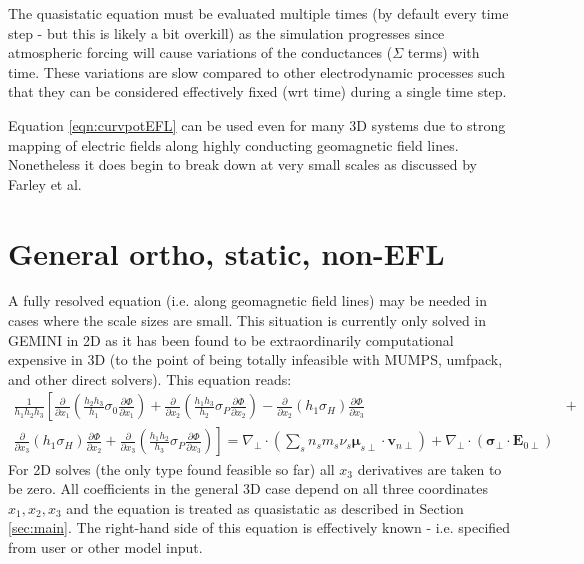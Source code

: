 \documentclass[11pt,letterpaper]{article}
\begin{document}
The quasistatic equation must be evaluated multiple times (by default every time step - but this is likely a bit overkill) as the simulation progresses since atmospheric forcing will cause variations of the conductances ($\Sigma$ terms) with time.  These variations are slow compared to other electrodynamic processes such that they can be considered effectively fixed (wrt time) during a single time step.

Equation \ref{eqn:curvpotEFL} can be used even for many 3D systems due to strong mapping of electric fields along highly conducting geomagnetic field lines.  Nonetheless it does begin to break down at very small scales as discussed by Farley et al.  


\section{General ortho, static, non-EFL}

A fully resolved equation (i.e. along geomagnetic field lines) may be needed in cases where the scale sizes are small.  This situation is currently only solved in GEMINI in 2D as it has been found to be extraordinarily computational expensive in 3D (to the point of being totally infeasible with MUMPS, umfpack, and other direct solvers).  This equation reads:  
\begin{eqnarray}
\frac{1}{h_1 h_2 h_3} \left[ \frac{\partial}{\partial x_1} \left( \frac{h_2 h_3}{h_1} \sigma_0 \frac{\partial \Phi}{\partial x_1} \right) + \frac{\partial}{\partial x_2} \left( \frac{h_1 h_3}{h_2} \sigma_P \frac{\partial \Phi}{\partial x_2} \right) -  \right. \frac{\partial}{\partial x_2} \left( h_1 \sigma_H \right) \frac{\partial \Phi}{\partial x_3} &+& \nonumber \\ \left. \frac{\partial}{\partial x_3} \left( h_1 \sigma_H \right) \frac{\partial \Phi}{\partial x_2} + \frac{\partial}{\partial x_3} \left( \frac{h_1 h_2}{h_3} \sigma_P \frac{\partial \Phi}{\partial x_3} \right)
\right]  = \nabla_\perp \cdot \left( \sum_s n_s m_s \nu_s \boldsymbol{\mu}_{s\perp} \cdot \mathbf{v}_{n\perp} \right) + \nabla_\perp \cdot \left( \boldsymbol{\sigma}_\perp \cdot \mathbf{E}_{0\perp} \right) \label{eqn:curvpot}
\end{eqnarray}
For 2D solves (the only type found feasible so far) all $x_3$ derivatives are taken to be zero.  All coefficients in the general 3D case depend on all three coordinates $x_1,x_2,x_3$ and the equation is treated as quasistatic as described in Section \ref{sec:main}.  The right-hand side of this equation is effectively known - i.e. specified from user or other model input.  
\end{document}
